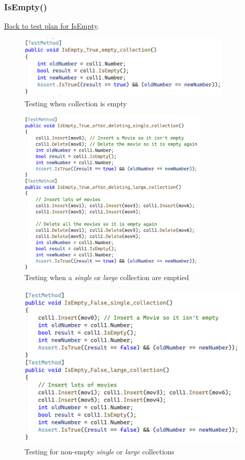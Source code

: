 \documentclass[a4paper]{article}
\begin{document}
\subsubsection{IsEmpty{()}}
\hyperlink{subsubsection.3.2.1}{Back to test plan for IsEmpty}.
\begin{figure}[H]
    \includegraphics[height=3cm]{data/IsEmpty-True-empty.png}
    \caption{Testing when collection is empty}
\end{figure}
\begin{figure}[H]
    \includegraphics[height=8cm]{data/IsEmpty-True-single-large.png}
    \caption{Testing when a \textit{single} or \textit{large} collection are emptied}
\end{figure}
\begin{figure}[H]
    \includegraphics[height=8cm]{data/IsEmpty-False-single-large.png}
    \caption{Testing for non-empty \textit{single} or \textit{large} collections}
\end{figure}
\end{document}
